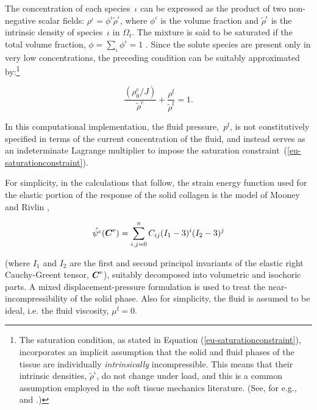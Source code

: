 The concentration of each species~$\iota$ can be expressed as the
product of two non-negative scalar fields: $\rho^\iota = \phi^\iota
\tilde{\rho}^\iota$, where $\phi^\iota$ is the volume fraction and
$\tilde{\rho}^\iota$ is the intrinsic density of species~$\iota$ in
$\Omega_{t}$. The mixture is said to be saturated if the total volume
fraction, \mbox{$\phi = \sum\limits_{\iota}\phi^\iota = 1$}
\citep{passmanetal}. Since the solute species are present only in very
low concentrations, the preceding condition can be suitably
approximated by:\footnote{The saturation condition, as stated in
  Equation (\ref{eu-saturationconstraint}), incorporates an implicit
  assumption that the solid and fluid phases of the tissue are
  individually {\em intrinsically} incompressible. This means that
  their intrinsic densities, $\tilde{\rho}^\iota$, do not change under
  load, and this is a common assumption employed in the soft tissue
  mechanics literature. (See, for e.g., \citet{mowetal1980} and
  \citet{ateshian07}.)}

\begin{equation}
\frac{\left(\rho_{0}^{\mathrm{c}}/J\right)}
{\tilde{\rho}^{\mathrm{c}}} + 
\frac{\rho^{\mathrm{f}}}{\tilde{\rho}^{\mathrm{f}}} = 1.
\label{eu-saturationconstraint}
\end{equation}

\noindent In this computational implementation, the fluid
pressure,~$p^{\mathrm{f}}$, is not constitutively specified in terms
of the current concentration of the fluid, and instead serves as an
indeterminate Lagrange multiplier to impose the saturation
constraint~(\ref{eu-saturationconstraint}).

For simplicity, in the calculations that follow, the strain energy
function used for the elastic portion of the response of the solid
collagen is the model of Mooney and Rivlin \citep{mooney1940},

\begin{equation}
\hat{\psi^{\mathrm{c}}} (\mbox{\boldmath$ C$}^{\mathrm{e}}) = \sum\limits_{i,j=0}^{n}
C_{ij} (I_{1}-3)^{i} (I_{2}-3)^{j}
\label{mooney-rivlin-model}
\end{equation}

\noindent (where $I_{1}$ and $I_{2}$ are the first and second
principal invariants of the elastic right Cauchy-Greent tensor,
$\mbox{\boldmath$ C$}^{\mathrm{e}}$), suitably decomposed into volumetric and isochoric
parts. A mixed displacement-pressure \citep{ZienkTay:89} formulation
is used to treat the near-incompressibility of the solid phase. Also
for simplicity, the fluid is assumed to be ideal, i.e. the fluid
viscosity, $\mu^{\mathrm{f}}=0$.

